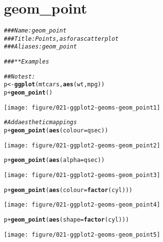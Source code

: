 \documentclass[a4paper,titlepage]{tufte-handout}\usepackage[]{graphicx}\usepackage[]{color}
\makeatletter
\def\maxwidth{ %
  \ifdim\Gin@nat@width>\linewidth
    \linewidth
  \else
    \Gin@nat@width
  \fi
}
\newcommand{\hlcom}[1]{\textcolor[rgb]{0.678,0.584,0.686}{\textit{#1}}}%
\newcommand{\hlopt}[1]{\textcolor[rgb]{0,0,0}{#1}}%
\newcommand{\hlstd}[1]{\textcolor[rgb]{0.345,0.345,0.345}{#1}}%
\newcommand{\hlkwb}[1]{\textcolor[rgb]{0.69,0.353,0.396}{#1}}%
\newcommand{\hlkwc}[1]{\textcolor[rgb]{0.333,0.667,0.333}{#1}}%
\newcommand{\hlkwd}[1]{\textcolor[rgb]{0.737,0.353,0.396}{\textbf{#1}}}%
\newenvironment{kframe}{%
 \def\at@end@of@kframe{}%
 \ifinner\ifhmode%
  \def\at@end@of@kframe{\end{minipage}}%
  \begin{minipage}{\columnwidth}%
 \fi\fi%
 \def\FrameCommand##1{\hskip\@totalleftmargin \hskip-\fboxsep
 \colorbox{shadecolor}{##1}\hskip-\fboxsep
     \hskip-\linewidth \hskip-\@totalleftmargin \hskip\columnwidth}%
 \MakeFramed {\advance\hsize-\width
   \@totalleftmargin\z@ \linewidth\hsize
   \@setminipage}}%
 {\par\unskip\endMakeFramed%
 \at@end@of@kframe}
\newenvironment{knitrout}{}{} %
\makeatother
\begin{document}
\section{geom\_point}

\begin{knitrout}
\color{fgcolor}\begin{kframe}
\begin{alltt}
\hlcom{### Name: geom_point}
\hlcom{### Title: Points, as for a scatterplot}
\hlcom{### Aliases: geom_point}

\hlcom{### ** Examples}

\hlcom{## No test: }
\hlstd{p} \hlkwb{<-} \hlkwd{ggplot}\hlstd{(mtcars,} \hlkwd{aes}\hlstd{(wt, mpg))}
\hlstd{p} \hlopt{+} \hlkwd{geom_point}\hlstd{()}
\end{alltt}
\end{kframe}
\texttt{[image: figure/021-ggplot2-geoms-geom\_point1]} 
\begin{kframe}\begin{alltt}
\hlcom{# Add aesthetic mappings}
\hlstd{p} \hlopt{+} \hlkwd{geom_point}\hlstd{(}\hlkwd{aes}\hlstd{(}\hlkwc{colour} \hlstd{= qsec))}
\end{alltt}
\end{kframe}
\texttt{[image: figure/021-ggplot2-geoms-geom\_point2]} 
\begin{kframe}\begin{alltt}
\hlstd{p} \hlopt{+} \hlkwd{geom_point}\hlstd{(}\hlkwd{aes}\hlstd{(}\hlkwc{alpha} \hlstd{= qsec))}
\end{alltt}
\end{kframe}
\texttt{[image: figure/021-ggplot2-geoms-geom\_point3]} 
\begin{kframe}\begin{alltt}
\hlstd{p} \hlopt{+} \hlkwd{geom_point}\hlstd{(}\hlkwd{aes}\hlstd{(}\hlkwc{colour} \hlstd{=} \hlkwd{factor}\hlstd{(cyl)))}
\end{alltt}
\end{kframe}
\texttt{[image: figure/021-ggplot2-geoms-geom\_point4]} 
\begin{kframe}\begin{alltt}
\hlstd{p} \hlopt{+} \hlkwd{geom_point}\hlstd{(}\hlkwd{aes}\hlstd{(}\hlkwc{shape} \hlstd{=} \hlkwd{factor}\hlstd{(cyl)))}
\end{alltt}
\end{kframe}
\texttt{[image: figure/021-ggplot2-geoms-geom\_point5]} 

\end{knitrout}
\end{document}
